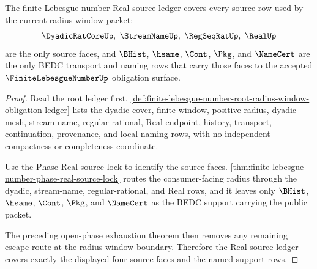 \begin{theorem}
\label{thm:finite-lebesgue-number-real-source-ledger-coverage}
The finite Lebesgue-number Real-source ledger covers every source row used by the current radius-window packet:
$$
\DyadicRatCoreUp,\ \StreamNameUp,\ \RegSeqRatUp,\ \RealUp
$$
are the only source faces, and $\BHist$, $\hsame$, $\Cont$, $\Pkg$, and $\NameCert$ are the only BEDC transport and naming rows that carry those faces to the accepted $\FiniteLebesgueNumberUp$ obligation surface.
\end{theorem}
\begin{proof}
Read the root ledger first. \autoref{def:finite-lebesgue-number-root-radius-window-obligation-ledger} lists the dyadic cover, finite window, positive radius, dyadic mesh, stream-name, regular-rational, Real endpoint, history, transport, continuation, provenance, and local naming rows, with no independent compactness or completeness coordinate.

Use the Phase Real source lock to identify the source faces. \autoref{thm:finite-lebesgue-number-phase-real-source-lock} routes the consumer-facing radius through the dyadic, stream-name, regular-rational, and Real rows, and it leaves only $\BHist$, $\hsame$, $\Cont$, $\Pkg$, and $\NameCert$ as the BEDC support carrying the public packet.

The preceding open-phase exhaustion theorem then removes any remaining escape route at the radius-window boundary. Therefore the Real-source ledger covers exactly the displayed four source faces and the named support rows.
\end{proof}

